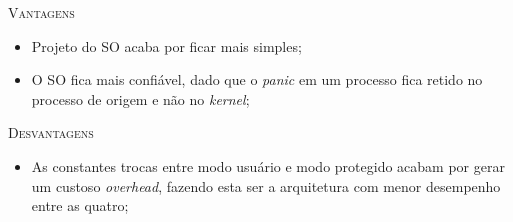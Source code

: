 \textsc{Vantagens}
\begin{itemize}
  \item Projeto do SO acaba por ficar mais simples;
  \item O SO fica mais confiável, dado que o \textit{panic} em um processo fica retido no processo de origem e não no \textit{kernel};
\end{itemize}

\textsc{Desvantagens}
\begin{itemize}
  \item As constantes trocas entre modo usuário e modo protegido acabam por gerar um custoso \textit{overhead}, fazendo esta ser a arquitetura com menor desempenho entre as quatro;
\end{itemize}


